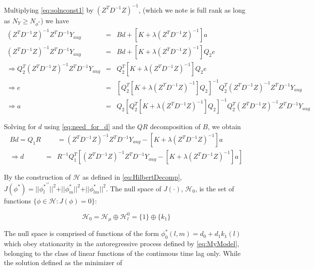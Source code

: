 Multiplying \eqref{eq:solnconst1} by $\left(Z^T D^{-1}Z\right)^{-1}$, (which we note is full rank as long as $N_Y \ge N_{\phi^*}$) we have 
\begin{eqnarray}
\left( Z^T D^{-1} Z \right)^{-1}Z^T D^{-1} Y_{aug} &=& Bd + \left[K + \lambda\left( Z^T D^{-1} Z \right)^{-1}\right] a \label{eq:need_for_d}\\
\left( Z^T D^{-1} Z \right)^{-1}Z^T D^{-1} Y_{aug} &=& Bd + \left[K + \lambda\left( Z^T D^{-1} Z \right)^{-1}\right] Q_2 e \nonumber\\
\Longrightarrow Q_2^T\left( Z^T D^{-1} Z \right)^{-1}Z^T D^{-1} Y_{aug} &=&  Q_2^T\left[K + \lambda\left( Z^T D^{-1} Z \right)^{-1}\right] Q_2 e \nonumber \\
\Longrightarrow e &=&  \left[ Q_2^T\left[K + \lambda\left( Z^T D^{-1} Z \right)^{-1}\right] Q_2 \right]^{-1}Q_2^T\left( Z^T D^{-1} Z \right)^{-1}Z^T D^{-1} Y_{aug} \nonumber\\
\Longrightarrow a &=&  Q_2\left[ Q_2^T\left[K + \lambda\left( Z^T D^{-1} Z \right)^{-1}\right] Q_2 \right]^{-1}Q_2^T\left( Z^T D^{-1} Z \right)^{-1}Z^T D^{-1} Y_{aug} \nonumber
\end{eqnarray}

Solving for $d$ using \eqref{eq:need_for_d} and the $QR$ decomposition of $B$, we obtain
\begin{eqnarray*}
Bd = Q_1R& &= \left( Z^T D^{-1} Z \right)^{-1}Z^T D^{-1} Y_{aug} -  \left[K + \lambda\left( Z^T D^{-1} Z \right)^{-1}\right] a\\
\Longrightarrow d &=& R^{-1}Q_1^T\left[ \left( Z^T D^{-1} Z \right)^{-1}Z^T D^{-1} Y_{aug} -  \left[K + \lambda\left( Z^T D^{-1} Z \right)^{-1}\right] a \right]
\end{eqnarray*}

By the construction of $\mathcal{H}$ as defined in \eqref{eq:HilbertDecomp}, $J\left(\phi^*\right) = \vert \vert {\phi_l^*}^{\prime \prime} \vert \vert^2  + \vert \vert  \phi_m^* \vert \vert^2 + \vert \vert \phi^*_{lm} \vert \vert^2$. The null space of $J\left(\cdot\right)$, $\mathcal{H}_0$, is the set of functions $\lbrace \phi \in \mathcal{H}: J\left(\phi\right) = 0 \rbrace$:

\[
\mathcal{H}_0 = \mathcal{H}_\mu \oplus \mathcal{H}_l^0 = \lbrace 1 \rbrace  \oplus \lbrace k_1 \rbrace
\]
\noindent

	The null space is comprised of functions of the form $\phi^*_0\left(l,m\right) = d_0 + d_1 k_1\left(l\right)$ which obey stationarity in the autoregressive process defined by \eqref{eq:MyModel}, belonging to the class of linear functions of the continuous time lag only. While the solution defined as the minimizer of 


